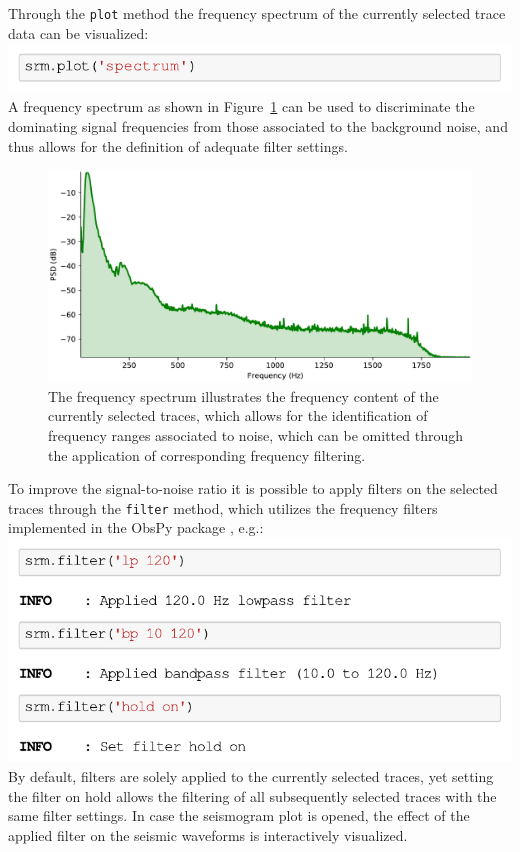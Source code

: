 \documentclass[a4paper,fleqn]{cas-sc}
\begin{document}
Through the \texttt{plot} method the frequency spectrum of the currently selected trace data can be visualized:
\newline
\includegraphics[width=.5\textwidth]{./figures/plot_spectrum.pdf}
\newline
A frequency spectrum as shown in Figure~\ref{fig:spectrum} can be used to discriminate the dominating signal frequencies from those associated to the background noise, and thus allows for the definition of adequate filter settings.
\begin{figure}
	\centering
	\includegraphics[width=.75\textwidth]{figures/spectrum.pdf}
	\caption{The frequency spectrum illustrates the frequency content of the currently selected traces, which allows for the identification of frequency ranges associated to noise, which can be omitted through the application of corresponding frequency filtering.}
	\label{fig:spectrum}
\end{figure}
To improve the signal-to-noise ratio it is possible to apply filters on the selected traces through the \texttt{filter} method, which utilizes the frequency filters implemented in the ObsPy package \citep[lowpass, highpass, bandpass and bandstop;][]{beyreuther2010}, e.g.:
\newline
\includegraphics[width=.5\textwidth]{./figures/filter.pdf}
\newline
By default, filters are solely applied to the currently selected traces, yet setting the filter on hold allows the filtering of all subsequently selected traces with the same filter settings.
In case the seismogram plot is opened, the effect of the applied filter on the seismic waveforms is interactively visualized.
\end{document}

